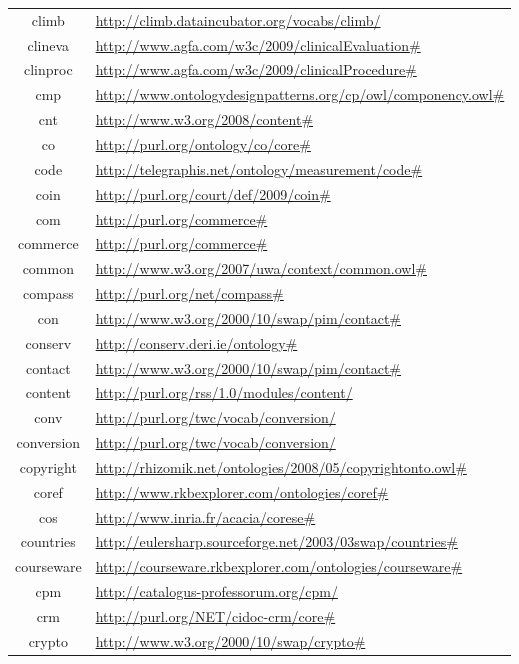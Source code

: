 \documentclass{article}
\begin{document}
\begin{longtable}{ c | p{8cm} }
		climb & \url{http://climb.dataincubator.org/vocabs/climb/} \\
		clineva & \url{http://www.agfa.com/w3c/2009/clinicalEvaluation#} \\
		clinproc & \url{http://www.agfa.com/w3c/2009/clinicalProcedure#} \\
		cmp & \url{http://www.ontologydesignpatterns.org/cp/owl/componency.owl#} \\
		cnt & \url{http://www.w3.org/2008/content#} \\
		co & \url{http://purl.org/ontology/co/core#} \\
		code & \url{http://telegraphis.net/ontology/measurement/code#} \\
		coin & \url{http://purl.org/court/def/2009/coin#} \\
		com & \url{http://purl.org/commerce#} \\
		commerce & \url{http://purl.org/commerce#} \\
		common & \url{http://www.w3.org/2007/uwa/context/common.owl#} \\
		compass & \url{http://purl.org/net/compass#} \\
		con & \url{http://www.w3.org/2000/10/swap/pim/contact#} \\
		conserv & \url{http://conserv.deri.ie/ontology#} \\
		contact & \url{http://www.w3.org/2000/10/swap/pim/contact#} \\
		content & \url{http://purl.org/rss/1.0/modules/content/} \\
		conv & \url{http://purl.org/twc/vocab/conversion/} \\
		conversion & \url{http://purl.org/twc/vocab/conversion/} \\
		copyright & \url{http://rhizomik.net/ontologies/2008/05/copyrightonto.owl#} \\
		coref & \url{http://www.rkbexplorer.com/ontologies/coref#} \\
		cos & \url{http://www.inria.fr/acacia/corese#} \\
		countries & \url{http://eulersharp.sourceforge.net/2003/03swap/countries#} \\
		courseware & \url{http://courseware.rkbexplorer.com/ontologies/courseware#} \\
		cpm & \url{http://catalogus-professorum.org/cpm/} \\
		crm & \url{http://purl.org/NET/cidoc-crm/core#} \\
		crypto & \url{http://www.w3.org/2000/10/swap/crypto#} \\

\end{longtable}
\end{document}

